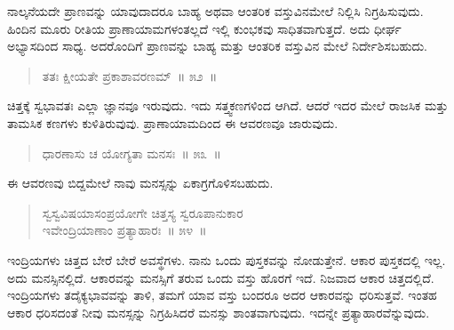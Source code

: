 \vspace{0.1cm}

ನಾಲ್ಕನೆಯದೇ ಪ್ರಾಣವನ್ನು ಯಾವುದಾದರೂ ಬಾಹ್ಯ ಅಥವಾ ಆಂತರಿಕ ವಸ್ತುವಿನಮೇಲೆ ನಿಲ್ಲಿಸಿ ನಿಗ್ರಹಿಸುವುದು. ಹಿಂದಿನ ಮೂರು ರೀತಿಯ ಪ್ರಾಣಾಯಾಮಗಳಂತಲ್ಲದೆ ಇಲ್ಲಿ ಕುಂಭಕವು ಸಾಧಿತವಾಗುತ್ತದೆ. ಅದು ಧೀರ್ಘ ಅಭ್ಯಾಸದಿಂದ ಸಾಧ್ಯ. ಅದರೊಂದಿಗೆ ಪ್ರಾಣವನ್ನು ಬಾಹ್ಯ ಮತ್ತು ಆಂತರಿಕ ವಸ್ತುವಿನ ಮೇಲೆ ನಿರ್ದೇಶಿಸಬಹುದು. 

\vspace{-0.2cm}

\begin{verse}
ತತಃ ಕ್ಷೀಯತೇ ಪ್ರಕಾಶಾವರಣಮ್​~॥ ೫೨~॥
\end{verse}

\vspace{-0.4cm}


\vspace{0.1cm}

ಚಿತ್ತಕ್ಕೆ ಸ್ವಭಾವತಃ ಎಲ್ಲಾ ಜ್ಞಾನವೂ ಇರುವುದು. ಇದು ಸತ್ತ್ವಕಣಗಳಿಂದ ಆಗಿದೆ. ಆದರೆ ಇದರ ಮೇಲೆ ರಾಜಸಿಕ ಮತ್ತು ತಾಮಸಿಕ ಕಣಗಳು ಕುಳಿತಿರುವುವು. ಪ್ರಾಣಾಯಾಮದಿಂದ ಈ ಆವರಣವೂ ಜಾರುವುದು. 

\vspace{-0.2cm}

\begin{verse}
ಧಾರಣಾಸು ಚ ಯೋಗ್ಯತಾ ಮನಸಃ~॥ ೫೩~॥
\end{verse}

\vspace{-0.4cm}


\vspace{0.2cm}

ಈ ಆವರಣವು ಬಿದ್ದಮೇಲೆ ನಾವು ಮನಸ್ಸನ್ನು ಏಕಾಗ್ರಗೊಳಿಸಬಹುದು. 


\begin{verse}
ಸ್ವಸ್ವವಿಷಯಾಸಂಪ್ರಯೋಗೇ ಚಿತ್ತಸ್ಯ ಸ್ವರೂಪಾನುಕಾರ\\ ಇವೇಂದ್ರಿಯಾಣಾಂ ಪ್ರತ್ಯಾಹಾರಃ~॥ ೫೪~॥
\end{verse}

\vspace{-0.3cm}


\vspace{0.2cm}

ಇಂದ್ರಿಯಗಳು ಚಿತ್ತದ ಬೇರೆ ಬೇರೆ ಅವಸ್ಥೆಗಳು. ನಾನು ಒಂದು ಪುಸ್ತಕವನ್ನು ನೋಡುತ್ತೇನೆ. ಆಕಾರ ಪುಸ್ತಕದಲ್ಲಿ ಇಲ್ಲ. ಅದು ಮನಸ್ಸಿನಲ್ಲಿದೆ. ಆಕಾರವನ್ನು ಮನಸ್ಸಿಗೆ ತರುವ ಒಂದು ವಸ್ತು ಹೊರಗೆ ಇದೆ. ನಿಜವಾದ ಆಕಾರ ಚಿತ್ತದಲ್ಲಿದೆ. ಇಂದ್ರಿಯಗಳು ತದೈಕ್ಯಭಾವವನ್ನು ತಾಳಿ, ತಮಗೆ ಯಾವ ವಸ್ತು ಬಂದರೂ ಅದರ ಆಕಾರವನ್ನು ಧರಿಸುತ್ತವೆ. ಇಂತಹ ಆಕಾರ ಧರಿಸದಂತೆ ನೀವು ಮನಸ್ಸನ್ನು ನಿಗ್ರಹಿಸಿದರೆ ಮನಸ್ಸು ಶಾಂತವಾಗುವುದು. ಇದನ್ನೇ ಪ್ರತ್ಯಾಹಾರವೆನ್ನುವುದು. 

